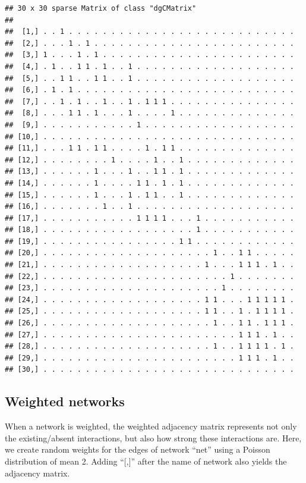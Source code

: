 \documentclass[
]{book}
\theoremstyle{definition}
\theoremstyle{definition}
\theoremstyle{definition}
\theoremstyle{definition}
\theoremstyle{remark}
\begin{document}
\begin{verbatim}
## 30 x 30 sparse Matrix of class "dgCMatrix"
##                                                                  
##  [1,] . . 1 . . . . . . . . . . . . . . . . . . . . . . . . . . .
##  [2,] . . . 1 . 1 . . . . . . . . . . . . . . . . . . . . . . . .
##  [3,] 1 . . . 1 . 1 . . . . . . . . . . . . . . . . . . . . . . .
##  [4,] . 1 . . 1 1 . 1 . . 1 . . . . . . . . . . . . . . . . . . .
##  [5,] . . 1 1 . . 1 1 . . 1 . . . . . . . . . . . . . . . . . . .
##  [6,] . 1 . 1 . . . . . . . . . . . . . . . . . . . . . . . . . .
##  [7,] . . 1 . 1 . . 1 . . 1 . 1 1 1 . . . . . . . . . . . . . . .
##  [8,] . . . 1 1 . 1 . . . 1 . . . . 1 . . . . . . . . . . . . . .
##  [9,] . . . . . . . . . . . 1 . . . . . . . . . . . . . . . . . .
## [10,] . . . . . . . . . . . . . . . . . . . . . . . . . . . . . .
## [11,] . . . 1 1 . 1 1 . . . . 1 . 1 1 . . . . . . . . . . . . . .
## [12,] . . . . . . . . 1 . . . . 1 . . 1 . . . . . . . . . . . . .
## [13,] . . . . . . 1 . . . 1 . . 1 1 . 1 . . . . . . . . . . . . .
## [14,] . . . . . . 1 . . . . 1 1 . 1 . 1 . . . . . . . . . . . . .
## [15,] . . . . . . 1 . . . 1 . 1 1 . . 1 . . . . . . . . . . . . .
## [16,] . . . . . . . 1 . . 1 . . . . . . . . . . . . . . . . . . .
## [17,] . . . . . . . . . . . 1 1 1 1 . . . 1 . . . . . . . . . . .
## [18,] . . . . . . . . . . . . . . . . . . 1 . . . . . . . . . . .
## [19,] . . . . . . . . . . . . . . . . 1 1 . . . . . . . . . . . .
## [20,] . . . . . . . . . . . . . . . . . . . . 1 . . 1 1 . . . . .
## [21,] . . . . . . . . . . . . . . . . . . . 1 . . . 1 1 1 . 1 . .
## [22,] . . . . . . . . . . . . . . . . . . . . . . 1 . . . . . . .
## [23,] . . . . . . . . . . . . . . . . . . . . . 1 . . . . . . . .
## [24,] . . . . . . . . . . . . . . . . . . . 1 1 . . . 1 1 1 1 1 .
## [25,] . . . . . . . . . . . . . . . . . . . 1 1 . . 1 . 1 1 1 1 .
## [26,] . . . . . . . . . . . . . . . . . . . . 1 . . 1 1 . 1 1 1 .
## [27,] . . . . . . . . . . . . . . . . . . . . . . . 1 1 1 . 1 . .
## [28,] . . . . . . . . . . . . . . . . . . . . 1 . . 1 1 1 1 . 1 .
## [29,] . . . . . . . . . . . . . . . . . . . . . . . 1 1 1 . 1 . .
## [30,] . . . . . . . . . . . . . . . . . . . . . . . . . . . . . .
\end{verbatim}

\subsection{Weighted networks}\label{weighted-networks}

When a network is weighted, the weighted adjacency matrix represents not only the existing/absent interactions, but also how strong these interactions are.
Here, we create random weights for the edges of network ``net'' using a Poisson distribution of mean 2.
Adding ``{[},{]}'' after the name of network also yields the adjacency matrix.
\end{document}
